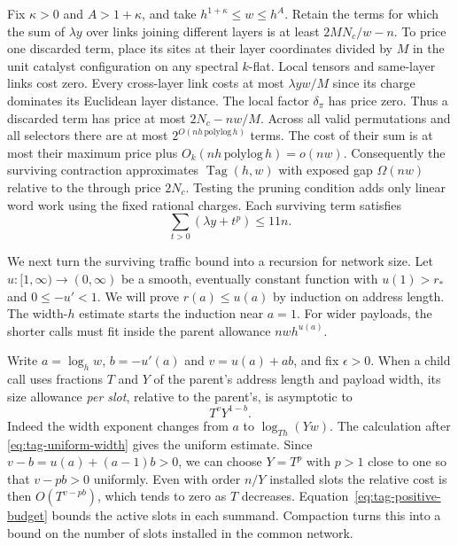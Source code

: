Fix $\kappa>0$ and $A>1+\kappa$, and take $h^{1+\kappa}\le w\le h^A$. Retain the terms for which
the sum of $\lambda y$ over links joining different layers is at least
$2MN_c/w-n$. To price one discarded term, place its sites at their layer
coordinates divided by $M$ in the unit catalyst configuration on any
spectral $k$-flat. Local tensors and same-layer links cost zero.
Every cross-layer link costs at most $\lambda yw/M$ since its charge
dominates its Euclidean layer distance. The local factor $\delta_\pi$
has price zero. Thus a discarded term has
price at most $2N_c-nw/M$. Across all valid permutations and all
selectors there are at most $2^{O(nh\,\mathrm{polylog}\,h)}$ terms.
The cost of their sum is at most their maximum price plus
$O_k(nh\,\mathrm{polylog}\,h)=o(nw)$. Consequently the surviving
contraction approximates $\operatorname{Tag}(h,w)$ with exposed gap
$\Omega(nw)$ relative to the through price $2N_c$. Testing the pruning
condition adds only linear word work using the fixed rational charges.
Each surviving term satisfies
\begin{equation}\label{eq:tag-positive-budget}
            \sum_{t>0}(\lambda y+t^p)\le 11n .
\end{equation}


We next turn the surviving traffic bound into a recursion for network
size. Let $u:[1,\infty)\to(0,\infty)$ be a smooth, eventually constant
function with $u(1)>r_*$ and $0\le-u'<1$. We will prove $r(a)\le u(a)$
by induction on address length. The width-$h$ estimate starts the
induction near $a=1$. For wider payloads, the shorter calls must fit
inside the parent allowance $nwh^{u(a)}$.

Write $a=\log_h w$, $b=-u'(a)$ and $v=u(a)+ab$, and fix
$\epsilon>0$. When a child call uses fractions $T$ and $Y$ of
the parent's address length and payload width, its size allowance
\emph{per slot}, relative to the parent's, is asymptotic to
\[
                          T^v Y^{1-b}.
\]
Indeed the width exponent changes from $a$ to $\log_{Th}(Yw)$.
The calculation after \eqref{eq:tag-uniform-width} gives the uniform
estimate. Since $v-b=u(a)+(a-1)b>0$, we can choose $Y=T^p$ with $p>1$
close to one so that $v-pb>0$ uniformly. Even with order $n/Y$ installed
slots the relative cost is then $O(T^{v-pb})$, which tends to zero
as $T$ decreases. Equation~\eqref{eq:tag-positive-budget}
bounds the active slots in each summand. Compaction turns this into a
bound on the number of slots installed in the common network.

